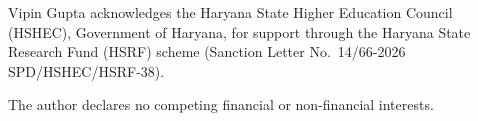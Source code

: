 \documentclass[pdflatex,sn-basic,Numbered]{sn-jnl}
\begin{document}
\backmatter

Vipin Gupta acknowledges the Haryana State Higher Education Council (HSHEC), Government of Haryana, for support through the Haryana State Research Fund (HSRF) scheme (Sanction Letter No.~14/66-2026 SPD/HSHEC/HSRF-38).

The author declares no competing financial or non-financial interests.

\begin{appendices}



\end{appendices}


\end{document}
